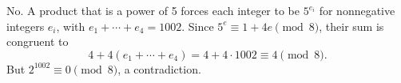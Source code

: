 No. A product that is a power of 5 forces each integer to be $5^{e_i}$ for nonnegative integers $e_i$, with $e_1+\cdots+e_4=1002$. Since $5^e\equiv1+4e\pmod8$, their sum is congruent to
\[4+4(e_1+\cdots+e_4)=4+4\cdot1002\equiv4\pmod8.\]
But $2^{1002}\equiv0\pmod8$, a contradiction.
